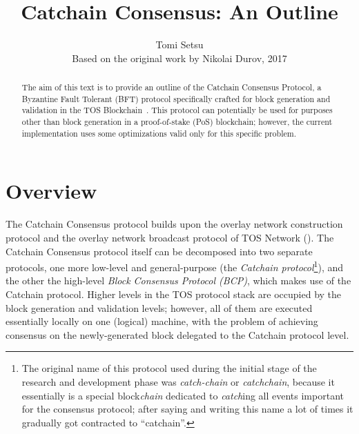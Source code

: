 \documentclass[12pt,oneside]{article}
\title{Catchain Consensus: An Outline}
\author{Tomi Setsu\\[0.3em]
\small Based on the original work by Nikolai Durov, 2017}
\def\mysection#1{\section{#1}\fancyhead[C]{\textsc{Chapter \textbf{\thesection.} #1}}}
\begin{document}
\maketitle

\begin{abstract}
  The aim of this text is to provide an outline of the Catchain Consensus Protocol, a Byzantine Fault Tolerant (BFT) protocol specifically crafted for block generation and validation in the TOS Blockchain~\cite{TOS}. This protocol can potentially be used for purposes other than block generation in a proof-of-stake (PoS) blockchain; however, the current implementation uses some optimizations valid only for this specific problem.
\end{abstract}

\tableofcontents
\clearpage

\mysection{Overview}\label{sect:overview}
The Catchain Consensus protocol builds upon the overlay network construction protocol and the overlay network broadcast protocol of TOS Network (\cite{TOS}). The Catchain Consensus protocol itself can be decomposed into two separate protocols, one more low-level and general-purpose (the {\em Catchain protocol\/}\footnote{The original name of this protocol used during the initial stage of the research and development phase was {\em catch-chain} or {\em catchchain}, because it essentially is a special block{\em chain} dedicated to {\em catch\/}ing all events important for the consensus protocol; after saying and writing this name a lot of times it gradually got contracted to ``catchain''.}), and the other the high-level {\em Block Consensus Protocol (BCP)}, which makes use of the Catchain protocol. Higher levels in the TOS protocol stack are occupied by the block generation and validation levels; however, all of them are executed essentially locally on one (logical) machine, with the problem of achieving consensus on the newly-generated block delegated to the Catchain protocol level.
\end{document}
